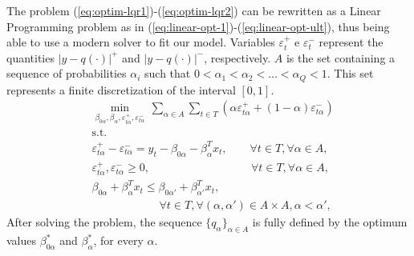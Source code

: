 The problem (\ref{eq:optim-lqr1})-(\ref{eq:optim-lqr2}) can be rewritten as a Linear Programming problem as in (\ref{eq:linear-opt-1})-(\ref{eq:linear-opt-ult}), thus being able to use a modern solver to fit our model. Variables $\varepsilon^+_t$ e $\varepsilon^-_t$ represent the quantities $|y-q(\cdot)|^+$ and $|y-q(\cdot)|^-$, respectively. $A$ is the set containing a sequence of probabilities  $\alpha_i$ such that $0 < \alpha_1 < \alpha_2 < \dots < \alpha_Q < 1$. This set represents a finite discretization of the interval $[0,1]$.  
\begin{align}
&\min_{\beta_{0\alpha},\beta_\alpha,\varepsilon_{t\alpha}^{+}, \varepsilon_{t\alpha}^{-}} \, \sum_{\alpha \in A} \sum_{t \in T}\left(\alpha \varepsilon_{t \alpha}^{+}+(1-\alpha)\varepsilon_{t \alpha}^{-}\right) \label{eq:linear-opt-1}\\
&\mbox{s.t. } \\
&\varepsilon_{t \alpha}^{+}-\varepsilon_{t \alpha}^{-}=y_{t} - \beta_{0\alpha} - \beta_{\alpha}^T x_{t}, \qquad  \forall t \in T,\forall \alpha \in A, \\
&\varepsilon_{t\alpha}^+,\varepsilon_{t\alpha}^- \geq 0, \qquad \qquad \qquad \quad \qquad    \forall t \in T,\forall \alpha \in A,\\ 
&
\beta_{0\alpha} + \beta_{\alpha}^T x_{t} \leq \beta_{0\alpha'} + \beta_{\alpha'}^T x_{t}, \nonumber \\
& \label{eq:linear-opt-ult} \qquad \qquad \qquad \forall t \in T, \forall (\alpha, \alpha') \in A \times A,  \alpha < \alpha',
\end{align}
After solving the problem, the sequence $\{ q_\alpha \}_{\alpha \in A}$ is fully defined by the optimum values $\beta^*_{0\alpha}$ and $\beta^*_\alpha$, for every $\alpha$.

